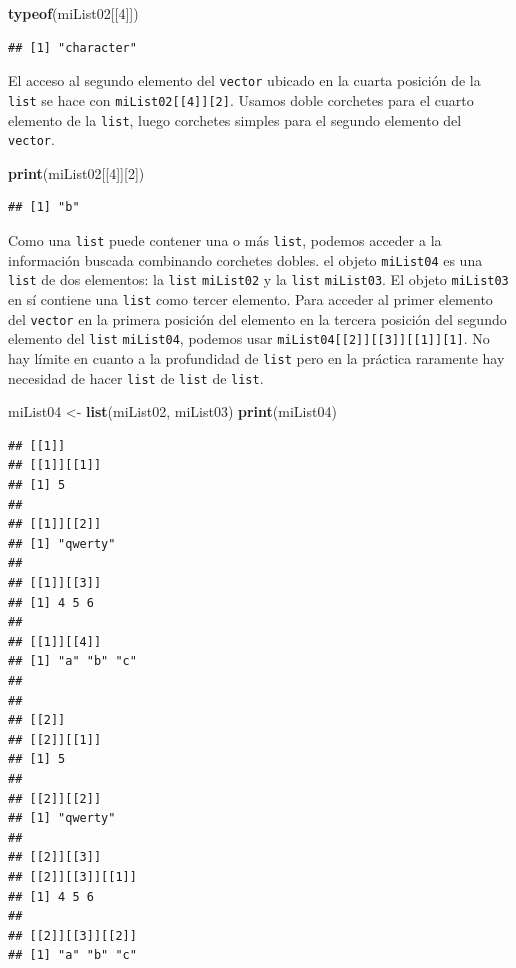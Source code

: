 \documentclass[]{book}
\newenvironment{Shaded}{\begin{snugshade}}{\end{snugshade}}
\newcommand{\KeywordTok}[1]{\textcolor[rgb]{0.13,0.29,0.53}{\textbf{#1}}}
\newcommand{\DecValTok}[1]{\textcolor[rgb]{0.00,0.00,0.81}{#1}}
\newcommand{\StringTok}[1]{\textcolor[rgb]{0.31,0.60,0.02}{#1}}
\newcommand{\NormalTok}[1]{#1}
\begin{document}
\begin{Shaded}
\begin{Highlighting}[]
\KeywordTok{typeof}\NormalTok{(miList02[[}\DecValTok{4}\NormalTok{]])}
\end{Highlighting}
\end{Shaded}

\begin{verbatim}
## [1] "character"
\end{verbatim}

El acceso al segundo elemento del \texttt{vector} ubicado en la cuarta
posición de la \texttt{list} se hace con
\texttt{miList02{[}{[}4{]}{]}{[}2{]}}. Usamos doble corchetes para el
cuarto elemento de la \texttt{list}, luego corchetes simples para el
segundo elemento del \texttt{vector}.

\begin{Shaded}
\begin{Highlighting}[]
\KeywordTok{print}\NormalTok{(miList02[[}\DecValTok{4}\NormalTok{]][}\DecValTok{2}\NormalTok{])}
\end{Highlighting}
\end{Shaded}

\begin{verbatim}
## [1] "b"
\end{verbatim}

Como una \texttt{list} puede contener una o más \texttt{list}, podemos
acceder a la información buscada combinando corchetes dobles. el objeto
\texttt{miList04} es una \texttt{list} de dos elementos: la
\texttt{list} \texttt{miList02} y la \texttt{list} \texttt{miList03}. El
objeto \texttt{miList03} en sí contiene una \texttt{list} como tercer
elemento. Para acceder al primer elemento del \texttt{vector} en la
primera posición del elemento en la tercera posición del segundo
elemento del \texttt{list} \texttt{miList04}, podemos usar
\texttt{miList04{[}{[}2{]}{]}{[}{[}3{]}{]}{[}{[}1{]}{]}{[}1{]}}. No hay
límite en cuanto a la profundidad de \texttt{list} pero en la práctica
raramente hay necesidad de hacer \texttt{list} de \texttt{list} de
\texttt{list}.

\begin{Shaded}
\begin{Highlighting}[]
\NormalTok{miList04 <-}\StringTok{ }\KeywordTok{list}\NormalTok{(miList02, miList03)}
\KeywordTok{print}\NormalTok{(miList04)}
\end{Highlighting}
\end{Shaded}

\begin{verbatim}
## [[1]]
## [[1]][[1]]
## [1] 5
## 
## [[1]][[2]]
## [1] "qwerty"
## 
## [[1]][[3]]
## [1] 4 5 6
## 
## [[1]][[4]]
## [1] "a" "b" "c"
## 
## 
## [[2]]
## [[2]][[1]]
## [1] 5
## 
## [[2]][[2]]
## [1] "qwerty"
## 
## [[2]][[3]]
## [[2]][[3]][[1]]
## [1] 4 5 6
## 
## [[2]][[3]][[2]]
## [1] "a" "b" "c"
\end{verbatim}
\end{document}
